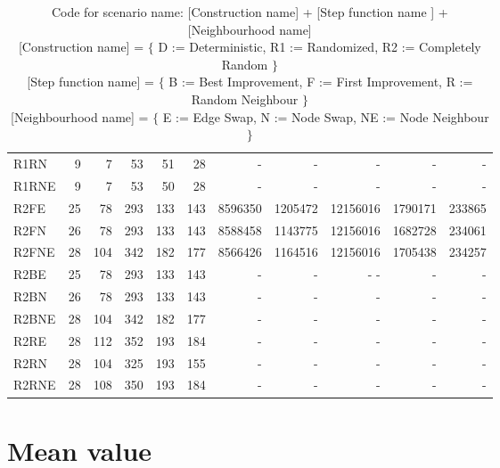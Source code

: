 \documentclass [11pt]{article}
\begin{document}
\begin{sidewaystable}
\begin{tabu} {| l |r | r |r |r |r |r |r |r |r |r |}
  R1RN    & 9  & 7   & 53   & 51 &  28  &  -   &   -    &   -    &    -   &   -    \\ 
  R1RNE    &9   &7    &53    &50  & 28   &  -   &   -    &   -    &    -   &   -    \\ 
  R2FE    & 25  &  78   & 293   & 133  &  143  &  8596350  &  1205472   & 12156016    &  1790171  & 233865   \\ 
  R2FN    & 26  &  78   & 293   & 133  &  143  &  8588458  &  1143775   & 12156016    &  1682728  & 234061   \\ 
  R2FNE    &28   &104    &342    &182   & 177   & 8566426   & 1164516    & 12156016    & 1705438   &234257    \\ 
  R2BE    & 25  &  78   & 293   & 133  &  143  &  -   &   -    &   -  -    &    -   &   -    \\ 
  R2BN    & 26  &  78   & 293   & 133  &  143  &  -   &   -    &   -    &    -   &   -    \\ 
  R2BNE    &28   &104    &342    &182   & 177   &  -   &   -    &   -    &    -   &   -    \\ 
  R2RE    & 28  & 112   & 352   & 193  &  184  &  -   &   -    &   -    &    -   &   -    \\ 
  R2RN    & 28  & 104   & 325   & 193  &  155  &  -   &   -    &   -    &    -   &   -    \\ 
  R2RNE    &28   &108    &350    &193   & 184   &  -   &   -    &   -    &    -   &   -    \\
\end{tabu}
\caption{ Code for scenario name: [Construction name] + [Step function name ]  + [Neighbourhood name] \\ 
          {[Construction name]} = $\{$  D := Deterministic, R1 := Randomized, R2 := Completely Random $\}$  \\
          {[Step function name]} = $\{$  B := Best Improvement, F := First Improvement, R := Random Neighbour $\}$ \\
          {[Neighbourhood name]} = $\{$  E := Edge Swap, N := Node Swap, NE := Node Neighbour $\}$ } 
\end{sidewaystable}

\section{Mean value}
\end{document}
